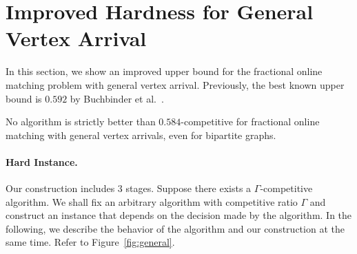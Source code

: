 \section{Improved Hardness for General Vertex Arrival}
\label{sec:general_upper}

In this section, we show an improved upper bound for the fractional online matching problem with general vertex arrival. Previously, the best known upper bound is $0.592$ by Buchbinder et al.~\cite{algorithmica/BuchbinderST19}. 

\begin{theorem}
\label{thm:general_upper}
No algorithm is strictly better than $0.584$-competitive for fractional online matching with general vertex arrivals, even for bipartite graphs.
\end{theorem}

\paragraph{Hard Instance.} Our construction includes $3$ stages. 
Suppose there exists a $\Gamma$-competitive algorithm.
We shall fix an arbitrary algorithm with competitive ratio $\Gamma$ and construct an instance that depends on the decision made by the algorithm. In the following, we describe the behavior of the algorithm and our construction at the same time.
Refer to Figure~\ref{fig:general}.

